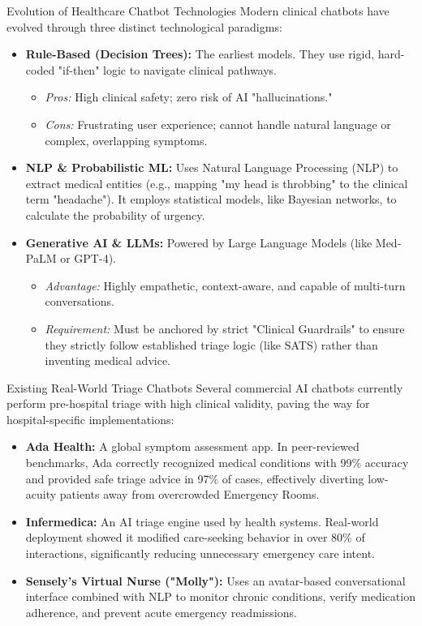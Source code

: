 \documentclass[aspectratio=169]{beamer}
\begin{document}
	\begin{frame}{Evolution of Healthcare Chatbot Technologies}
		Modern clinical chatbots have evolved through three distinct technological paradigms:
		\vspace{0.2cm}
		\begin{itemize}
			\item \textbf{Rule-Based (Decision Trees):} The earliest models. They use rigid, hard-coded "if-then" logic to navigate clinical pathways. 
			\begin{itemize}
				\item \textit{Pros:} High clinical safety; zero risk of AI "hallucinations."
				\item \textit{Cons:} Frustrating user experience; cannot handle natural language or complex, overlapping symptoms.
			\end{itemize}
			\item \textbf{NLP \& Probabilistic ML:} Uses Natural Language Processing (NLP) to extract medical entities (e.g., mapping "my head is throbbing" to the clinical term "headache"). It employs statistical models, like Bayesian networks, to calculate the probability of urgency.
			\item \textbf{Generative AI \& LLMs:} Powered by Large Language Models (like Med-PaLM or GPT-4). 
			\begin{itemize}
				\item \textit{Advantage:} Highly empathetic, context-aware, and capable of multi-turn conversations.
				\item \textit{Requirement:} Must be anchored by strict "Clinical Guardrails" to ensure they strictly follow established triage logic (like SATS) rather than inventing medical advice.
			\end{itemize}
		\end{itemize}
	\end{frame}
	
	\begin{frame}{Existing Real-World Triage Chatbots}
		Several commercial AI chatbots currently perform pre-hospital triage with high clinical validity, paving the way for hospital-specific implementations:
		\vspace{0.2cm}
		\begin{itemize}
			\item \textbf{Ada Health:} A global symptom assessment app. In peer-reviewed benchmarks, Ada correctly recognized medical conditions with 99\% accuracy and provided safe triage advice in 97\% of cases, effectively diverting low-acuity patients away from overcrowded Emergency Rooms.
			\item \textbf{Infermedica:} An AI triage engine used by health systems. Real-world deployment showed it modified care-seeking behavior in over 80\% of interactions, significantly reducing unnecessary emergency care intent.
			\item \textbf{Sensely's Virtual Nurse ("Molly"):} Uses an avatar-based conversational interface combined with NLP to monitor chronic conditions, verify medication adherence, and prevent acute emergency readmissions.
		\end{itemize}
	\end{frame}
	
\end{document}
